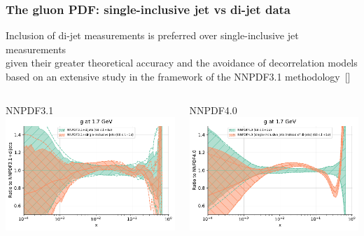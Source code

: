 \documentclass{beamer}
\begin{document}
\begin{frame}
 \frametitle{The gluon PDF: single-inclusive jet vs di-jet data}
 \footnotesize
 \centering
 Inclusion of di-jet measurements is preferred over single-inclusive jet measurements\\
 given their greater theoretical accuracy and the avoidance of decorrelation models\\
 {\scriptsize based on an extensive study in the framework of the NNPDF3.1 methodology~{\tiny{[{\color{salmon}{EPJ C80 (2020) 8}}]}}}\\
 \vspace{0.2cm}
 \begin{columns}[c]
  \begin{column}{0.5\textwidth}
   \centering
   NNPDF3.1\\
   \includegraphics[width=\columnwidth]{plots/gluon_3}\\
  \end{column}
  \begin{column}{0.5\textwidth}
   \centering
   NNPDF4.0\\
   \includegraphics[width=\columnwidth]{plots/gluon_4}\\ 

\end{column}
\end{columns}
\end{frame}
\end{document}
